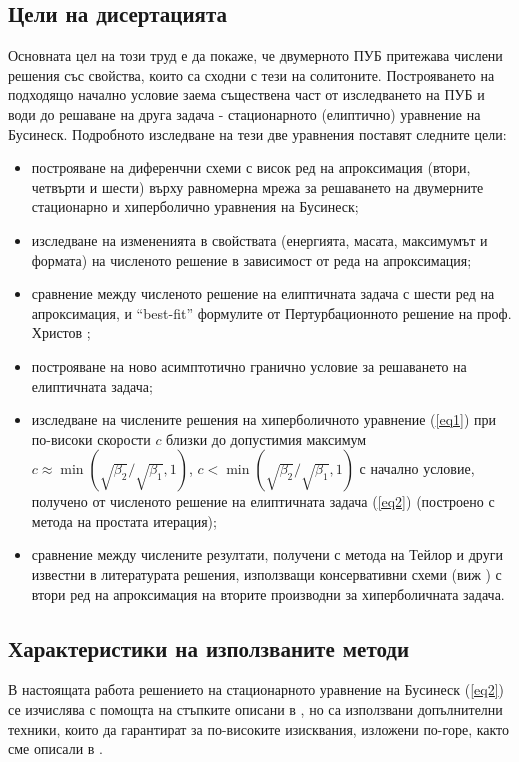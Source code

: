 \documentclass[a4paper]{article}
\newcommand{\rf}[1]{(\ref{#1})}
\theoremstyle{remark}
\begin{document}
\begin{large}
\subsection{Цели на дисертацията}
Основната цел на този труд е да покаже, че двумерното ПУБ притежава числени решения със свойства, които са сходни с тези на солитоните. Построяването на подходящо начално условие заема съществена част от изследването на ПУБ и води до решаване на друга задача - стационарното (елиптично) уравнение на Бусинеск. Подробното изследване на тези две уравнения поставят следните цели:
\begin{itemize}
  \item построяване на диференчни схеми с висок ред на апроксимация (втори, четвърти и шести) върху равномерна мрежа за решаването на двумерните стационарно и хиперболично уравнения на Бусинеск;
  \item изследване на измененията в свойствата (енергията, масата, максимумът и формата) на численото решение в зависимост от реда на апроксимация;
  \item сравнение между численото решение на елиптичната задача с шести ред на апроксимация, и ``best-fit'' формулите от Пертурбационното решение на проф. Христов \cite{ref15};
  \item построяване на ново асимптотично гранично условие за решаването на елиптичната задача;
  \item изследване на числените решения на хиперболичното уравнение \rf{eq1} при по-високи скорости $c$ близки до допустимия максимум $c \approx \min (\sqrt{\beta_2}/ \sqrt{\beta_1},1)$, $c < \min (\sqrt{\beta_2}/ \sqrt{\beta_1},1)$ с начално условие, получено от численото решение на елиптичната задача \rf{eq2} (построено с метода на простата итерация);
  \item сравнение между числените резултати, получени с метода на Тейлор и други известни в литературата решения, използващи консервативни схеми (виж \cite{ref20, ref23}) с втори ред на апроксимация на вторите производни за хиперболичната задача.
\end{itemize}
 
\subsection{Характеристики на използваните методи}
В настоящата работа решението на стационарното уравнение на Бусинеск \rf{eq2} се изчислява с помощта на стъпките описани в \cite{ref117,ref116}, но са използвани допълнителни техники, които да гарантират за по-високите изисквания, изложени по-горе, както сме описали в \cite{ref16}. 


\end{large}
\end{document}
